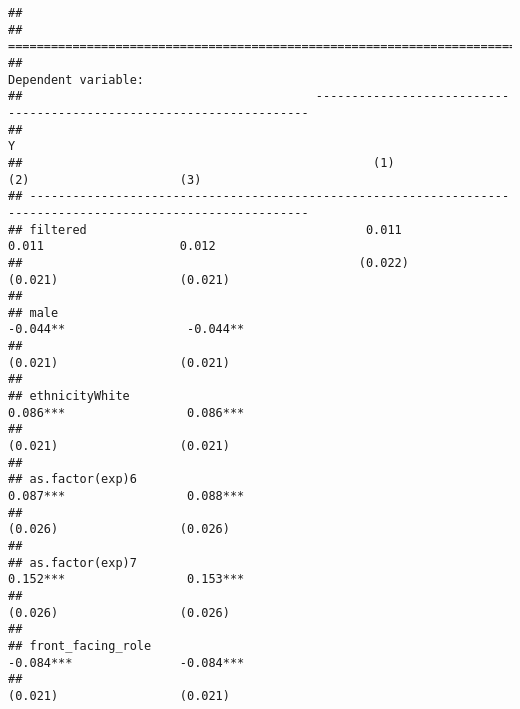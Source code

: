 \documentclass[
]{article}
\begin{document}
\begin{verbatim}
## 
## =============================================================================================================
##                                                                  Dependent variable:                         
##                                         ---------------------------------------------------------------------
##                                                                           Y                                  
##                                                 (1)                    (2)                     (3)           
## -------------------------------------------------------------------------------------------------------------
## filtered                                       0.011                  0.011                   0.012          
##                                               (0.022)                (0.021)                 (0.021)         
##                                                                                                              
## male                                                                -0.044**                 -0.044**        
##                                                                      (0.021)                 (0.021)         
##                                                                                                              
## ethnicityWhite                                                      0.086***                 0.086***        
##                                                                      (0.021)                 (0.021)         
##                                                                                                              
## as.factor(exp)6                                                     0.087***                 0.088***        
##                                                                      (0.026)                 (0.026)         
##                                                                                                              
## as.factor(exp)7                                                     0.152***                 0.153***        
##                                                                      (0.026)                 (0.026)         
##                                                                                                              
## front_facing_role                                                   -0.084***               -0.084***        
##                                                                      (0.021)                 (0.021)         

\end{verbatim}
\end{document}
